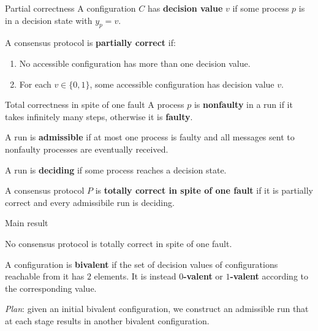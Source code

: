 \documentclass[12pt]{beamer}
\begin{document}
  \begin{frame}{Partial correctness}
    A configuration \(C\) has \textbf{decision value} \(v\) if some process
    \(p\) is in a decision state with \(y_p = v\).

    \vspace{0.25cm}

    \begin{definition}
      A consensus protocol is \textbf{partially correct} if:
      \begin{enumerate}
        \item No accessible configuration has more than one decision value.
        \item For each \(v\in\{0,1\}\), some accessible configuration has decision value \(v\).
      \end{enumerate}
    \end{definition}
  \end{frame}

  \begin{frame}{Total correctness in spite of one fault}
    A process \(p\) is \textbf{nonfaulty} in a run if it takes infinitely many
    steps, otherwise it is \textbf{faulty}.

    \vspace{0.25cm}

    A run is \textbf{admissible} if at most one process is faulty and all
    messages sent to nonfaulty processes are eventually received.

    \vspace{0.25cm}

    A run is \textbf{deciding} if some process reaches a decision state.

    \vspace{0.25cm}

    \begin{definition}
      A consensus protocol \(P\) is \textbf{totally correct in spite of one
      fault} if it is partially correct and every admissibile run is deciding.
    \end{definition}
  \end{frame}

  \begin{frame}{Main result}
    \begin{theorem}
      No consensus protocol is totally correct in spite of one fault.
    \end{theorem}

    \vspace{0.25cm}

    A configuration is \textbf{bivalent} if the set of decision values of
    configurations reachable from it has \(2\) elements. It is instead
    \textbf{\(0\)-valent} or \textbf{\(1\)-valent} according to the
    corresponding value.

    \vspace{0.25cm}

    \emph{Plan}: given an initial bivalent configuration, we construct an
    admissible run that at each stage results in another bivalent
    configuration.
  \end{frame}
\end{document}
